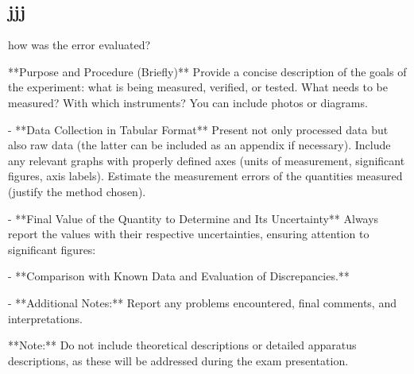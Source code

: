 \subsection{jjj}
how was the error evaluated?

**Purpose and Procedure (Briefly)**  
Provide a concise description of the goals of the experiment: what is being measured, verified, or tested. What needs to be measured? With which instruments? You can include photos or diagrams.

- **Data Collection in Tabular Format**  
  Present not only processed data but also raw data (the latter can be included as an appendix if necessary).  
  Include any relevant graphs with properly defined axes (units of measurement, significant figures, axis labels). Estimate the measurement errors of the quantities measured (justify the method chosen).  

- **Final Value of the Quantity to Determine and Its Uncertainty**  
  Always report the values with their respective uncertainties, ensuring attention to significant figures:  

- **Comparison with Known Data and Evaluation of Discrepancies.**

- **Additional Notes:** Report any problems encountered, final comments, and interpretations.  

**Note:** Do not include theoretical descriptions or detailed apparatus descriptions, as these will be addressed during the exam presentation.